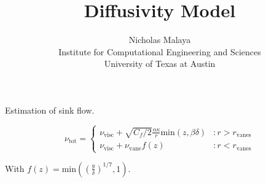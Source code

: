 \documentclass{article}
\title{\bf{Diffusivity Model}}
\author{Nicholas Malaya \\ Institute for Computational Engineering and Sciences \\ University of Texas at Austin} \date{}
\begin{document}
\maketitle

\newpage
Estimation of sink flow. 


\[ \nu_{\text{tot}} = \left\{
  \begin{array}{lr}
    \nu_{\text{visc}} + \sqrt{C_f /2} \frac{\alpha \kappa}{r} \text{min}(z,\beta \delta) & : r > r_\text{vanes} \\
    \nu_{\text{visc}} + \nu_{\text{vane}}f(z)                                            & : r < r_\text{vanes}
  \end{array}
\right.
\]

With $f(z) = \text{min}((\frac{y}{\delta})^{1/7},1)$.
\end{document}
